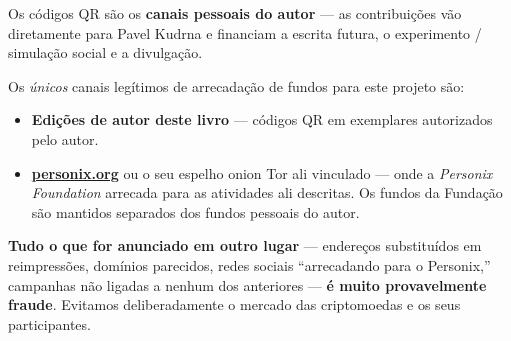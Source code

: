 \begin{minipage}[t]{0.60\textwidth}
\vspace{0pt}
\begin{mdframed}[
  linewidth=0.7pt,roundcorner=5pt,
  innerleftmargin=10pt,innerrightmargin=10pt,
  innertopmargin=8pt,innerbottommargin=8pt,
  skipabove=0pt,skipbelow=0pt,
  linecolor=cbwarning!50,backgroundcolor=cbwarning!5,
  nobreak=true,
  needspace=4\baselineskip,
]
\footnotesize
Os códigos QR são os \textbf{canais pessoais do autor} --- as contribuições vão diretamente para Pavel Kudrna e financiam a escrita futura, o experimento / simulação social e a divulgação.

\smallskip
Os \emph{únicos} canais legítimos de arrecadação de fundos para este projeto são:

\smallskip
\begin{itemize}
\setlength{\itemsep}{0pt}
\setlength{\topsep}{0pt}
\item \textbf{Edições de autor deste livro} --- códigos QR em exemplares autorizados pelo autor.
\item \href{https://personix.org}{\textbf{personix.org}} ou o seu espelho onion Tor ali vinculado --- onde a \emph{Personix Foundation} arrecada para as atividades ali descritas. Os fundos da Fundação são mantidos separados dos fundos pessoais do autor.
\end{itemize}

\smallskip
\textbf{Tudo o que for anunciado em outro lugar} --- endereços substituídos em reimpressões, domínios parecidos, redes sociais ``arrecadando para o Personix,'' campanhas não ligadas a nenhum dos anteriores --- \textbf{é muito provavelmente fraude}. Evitamos deliberadamente o mercado das criptomoedas e os seus participantes.
\end{mdframed}
\end{minipage}

\clearpage
